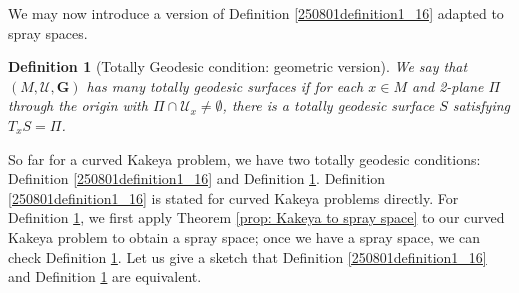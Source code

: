\documentclass{article}
\numberwithin{equation}{section}
\theoremstyle{plain}
\newtheorem{definition}[theorem]{Definition}
\begin{document}
We may now introduce a version of Definition \ref{250801definition1_16} adapted to spray spaces. 
\begin{definition}[Totally Geodesic condition: geometric version]\label{def: T.G. geometric}
    We say that $(M, \mathcal U,\mathbf G)$ has many totally geodesic surfaces if for each $x \in M$ and 2-plane $\Pi$ through the origin with $\Pi \cap \mathcal U_x \neq \emptyset$, there is a totally geodesic surface $S$ satisfying $T_x S = \Pi$.
\end{definition}







So far for a curved Kakeya problem, we have two totally geodesic conditions: Definition \ref{250801definition1_16} and Definition \ref{def: T.G. geometric}. Definition \ref{250801definition1_16} is stated for curved Kakeya problems directly. For Definition \ref{def: T.G. geometric}, we first apply Theorem \ref{prop: Kakeya to spray space} to our curved Kakeya problem to obtain a spray space; once we have a spray space, we can check Definition \ref{def: T.G. geometric}. 
Let us give a sketch that Definition \ref{250801definition1_16} and Definition \ref{def: T.G. geometric} are equivalent. 
\end{document}
